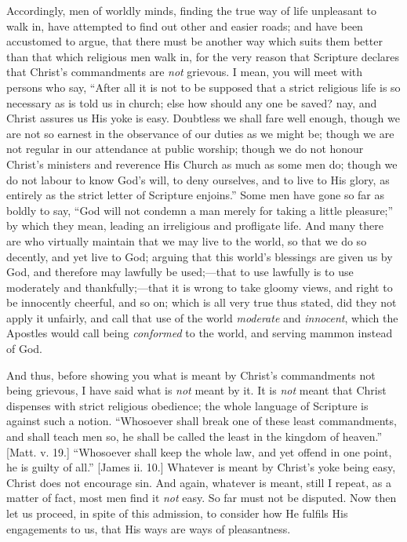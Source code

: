 Accordingly, men of worldly minds, finding the true
way of life unpleasant to walk in, have attempted to find
out other and easier roads; and have been accustomed to
argue, that there must be another way which suits them
better than that which religious men walk in, for the
very reason that Scripture declares that Christ's
commandments are \emph{not} grievous. I mean, you will meet with
persons who say, ``After all it is not to be supposed
that a strict religious life is so necessary as is told
us in church; else how should any one be saved? nay, and
Christ assures us His yoke is easy. Doubtless we shall
fare well enough, though we are not so earnest in the
observance of our duties as we might be; though we are
not regular in our attendance at public worship; though
we do not honour Christ's ministers and reverence His
Church as much as some men do; though we do not labour to
know God's will, to deny ourselves, and to live to His
glory, as entirely as the strict letter of Scripture
enjoins.'' Some men have gone so far as boldly to
say, ``God will not condemn a man merely for taking a
little pleasure;'' by which they mean, leading an
irreligious and profligate life. And many there are who
virtually maintain that we may live to the world, so that
we do so decently, and yet live to God; arguing that this
world's blessings are given us by God, and therefore may
lawfully be used;—that to use lawfully is to use
moderately and thankfully;—that it is wrong to take
gloomy views, and right to be innocently cheerful, and so
on; which is all very true thus stated, did they not
apply it unfairly, and call that use of the world \emph{moderate}
and \emph{innocent}, which the Apostles would call being \emph{conformed}
to the world, and serving mammon instead of God.

And thus, before showing you what is meant by Christ's
commandments not being grievous, I have said what is \emph{not}
meant by it. It is \emph{not} meant that Christ dispenses
with strict religious obedience; the whole language of
Scripture is against such a notion. ``Whosoever shall
break one of these least commandments, and shall teach
men so, he shall be called the least in the kingdom of
heaven.'' [Matt. v. 19.] ``Whosoever shall keep
the whole law, and yet offend in one point, he is guilty
of all.'' [James ii. 10.] Whatever is meant by
Christ's yoke being easy, Christ does not encourage sin.
And again, whatever is meant, still I repeat, as a matter
of fact, most men find it \emph{not} easy. So far must
not be disputed. Now then let us proceed, in spite of
this admission, to consider how He fulfils His
engagements to us, that His ways are ways of
pleasantness.

